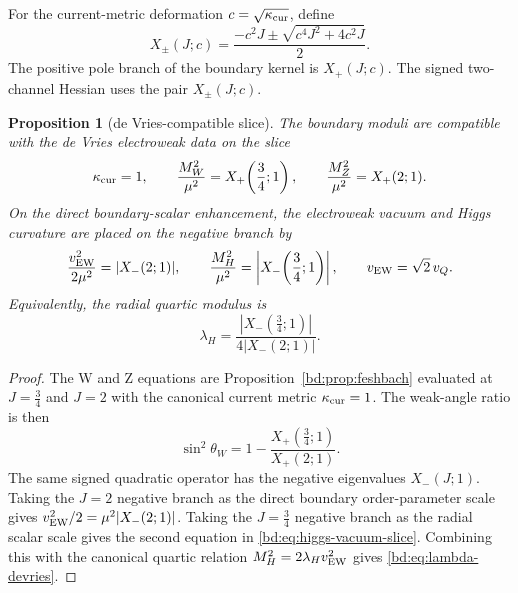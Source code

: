 \documentclass[11pt]{article}
\theoremstyle{plain}
\newtheorem{proposition}{Proposition}[section]
\theoremstyle{definition}
\begin{document}
For the current-metric deformation \(c=\sqrt{\kappa_{\rm cur}}\), define
\begin{equation}
  X_\pm(J;c)=
  \frac{-c^2J\pm\sqrt{c^4J^2+4c^2J}}{2}.
  \label{bd:eq:xpmc}
\end{equation}
The positive pole branch of the boundary kernel is \(X_+(J;c)\).  The signed
two-channel Hessian uses the pair \(X_\pm(J;c)\).

\begin{proposition}[de Vries-compatible slice]
\label{bd:prop:devries-slice}
The boundary moduli are compatible with the de Vries electroweak data on the
slice
\begin{equation}
  \kappa_{\rm cur}=1,\qquad
  \frac{M_W^2}{\mu^2}=X_+\!\left(\frac34;1\right),\qquad
  \frac{M_Z^2}{\mu^2}=X_+(2;1).
  \label{bd:eq:wz-slice}
\end{equation}
On the direct boundary-scalar enhancement, the electroweak vacuum and Higgs
curvature are placed on the negative branch by
\begin{equation}
  \frac{v_{\rm EW}^2}{2\mu^2}=|X_-(2;1)|,\qquad
  \frac{M_H^2}{\mu^2}=
  \left|X_-\!\left(\frac34;1\right)\right|,
  \qquad
  v_{\rm EW}=\sqrt2\,v_Q .
  \label{bd:eq:higgs-vacuum-slice}
\end{equation}
Equivalently, the radial quartic modulus is
\begin{equation}
  \lambda_H=
  \frac{|X_-(\frac34;1)|}{4|X_-(2;1)|}.
  \label{bd:eq:lambda-devries}
\end{equation}
\end{proposition}

\begin{proof}
The W and Z equations are Proposition~\ref{bd:prop:feshbach} evaluated at
\(J=\tfrac34\) and \(J=2\) with the canonical current metric
\(\kappa_{\rm cur}=1\).  The weak-angle ratio is then
\[
  \sin^2\theta_W
  =
  1-\frac{X_+(\frac34;1)}{X_+(2;1)}.
\]
The same signed quadratic operator has the negative eigenvalues \(X_-(J;1)\).
Taking the \(J=2\) negative branch as the direct boundary order-parameter
scale gives \(v_{\rm EW}^2/2=\mu^2|X_-(2;1)|\).  Taking the
\(J=\tfrac34\) negative branch as the radial scalar scale gives the second
equation in \eqref{bd:eq:higgs-vacuum-slice}.  Combining this with the canonical
quartic relation \(M_H^2=2\lambda_Hv_{\rm EW}^2\) gives
\eqref{bd:eq:lambda-devries}.
\end{proof}
\end{document}
